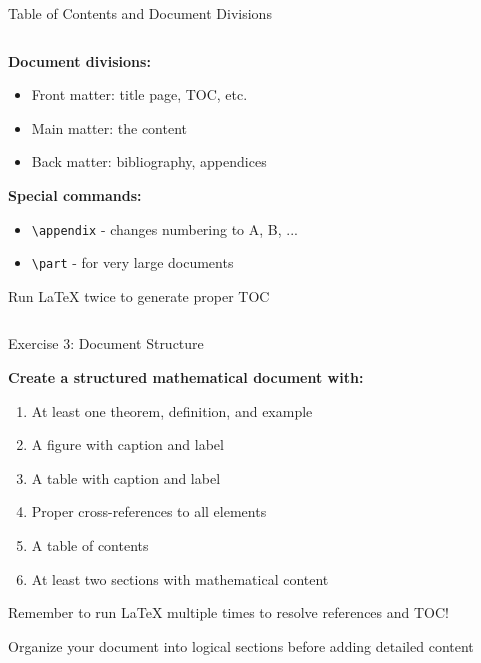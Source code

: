 \begin{frame}[fragile]{Table of Contents and Document Divisions}
\begin{columns}
\begin{column}{0.5\textwidth}
			\textbf{Document divisions:}
			\begin{itemize}
				\item Front matter: title page, TOC, etc.
				\item Main matter: the content
				\item Back matter: bibliography, appendices
			\end{itemize}
			
			\textbf{Special commands:}
			\begin{itemize}
				\item \texttt{\textbackslash appendix} - changes numbering to A, B, ...
				\item \texttt{\textbackslash part} - for very large documents
			\end{itemize}
			
			\begin{tip}
				Run LaTeX twice to generate proper TOC
			\end{tip}
		\end{column}
	\end{columns}
\end{frame}

\begin{frame}{Exercise 3: Document Structure}
	\begin{practice}
		\textbf{Create a structured mathematical document with:}
		\begin{enumerate}
			\item At least one theorem, definition, and example
			\item A figure with caption and label 
			\item A table with caption and label
			\item Proper cross-references to all elements
			\item A table of contents
			\item At least two sections with mathematical content
		\end{enumerate}
	\end{practice}
	
	\begin{warning}
		Remember to run LaTeX multiple times to resolve references and TOC!
	\end{warning}
	
	\begin{tip}
		Organize your document into logical sections before adding detailed content
	\end{tip}
\end{frame}